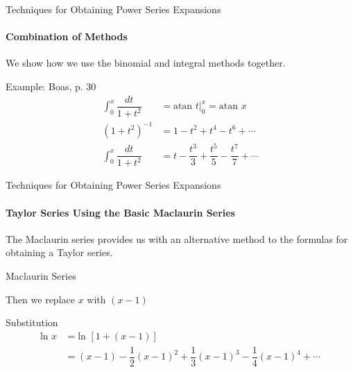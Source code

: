 \documentclass{beamer}
\begin{document}
\begin{frame}{Techniques for Obtaining Power Series Expansions}
   	\framesubtitle{Combination of Methods}
	We show how we use the binomial and integral methods together.
	\begin{exampleblock}{Example: Boas, p. 30}
	\begin{align*}
	\int_{0}^{x}\dfrac{dt}{1+t^{2}} &= \mbox{atan\ }t\Big|_{0}^{x} = \mbox{atan\ }x \\
	(1+t^{2})^{-1} &= 1 - t^{2}+ t^{4}- t^{6}+\cdots \\
	\int_{0}^{x}\dfrac{dt}{1+t^{2}} &= t - \dfrac{t^{3}}{3} + \dfrac{t^{5}}{5} - \dfrac{t^{7}}{7} +\cdots
	\end{align*}
	\end{exampleblock}
\end{frame}
  
\begin{frame}{Techniques for Obtaining Power Series Expansions}
    \framesubtitle{Taylor Series Using the Basic Maclaurin Series}
    The Maclaurin series provides us with an alternative method to the formulas for obtaining a Taylor series.
   \begin{exampleblock}{Maclaurin Series}
   \end{exampleblock}
   Then we replace $x$ with $(x-1)$
   \begin{exampleblock}{Substitution}
   	\begin{align*}
   	    \mbox{ln\ } x&= \mbox{ln\ } [1+(x-1)] \\
	    &= (x-1)-\dfrac{1}{2}(x-1)^2+\dfrac{1}{3}(x-1)^3-\dfrac{1}{4}(x-1)^4+\cdots
	\end{align*}
   \end{exampleblock}
\end{frame}
  
\end{document}
